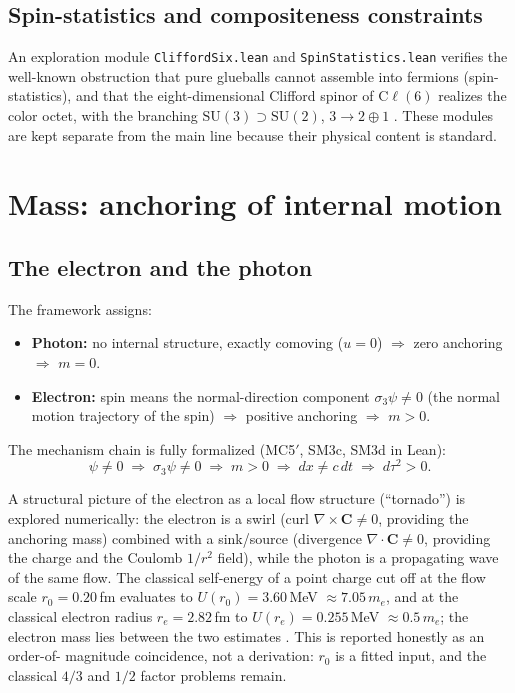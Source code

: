 \documentclass[aps,prd,preprint,superscriptaddress,amsmath,amssymb]{revtex4-2}
\begin{document}
\subsection{Spin-statistics and compositeness constraints}

An exploration module \texttt{CliffordSix.lean} and
\texttt{SpinStatistics.lean} verifies the well-known obstruction that pure
glueballs cannot assemble into fermions (spin-statistics), and that the
eight-dimensional Clifford spinor of $\mathrm{C}\ell(6)$ realizes the color
octet, with the branching $\mathrm{SU}(3)\supset\mathrm{SU}(2)$,
$3\to 2\oplus 1$ \cite{ProjectionPhysics}.  These modules are kept separate
from the main line because their physical content is standard.

\section{Mass: anchoring of internal motion}\label{sec:mass}

\subsection{The electron and the photon}

The framework assigns:
\begin{itemize}
  \item \textbf{Photon:} no internal structure, exactly comoving
  ($u=0$) $\Longrightarrow$ zero anchoring $\Longrightarrow$ $m=0$.
  \item \textbf{Electron:} spin means the normal-direction component
  $\sigma_3\psi\neq 0$ (the normal motion trajectory of the spin)
  $\Longrightarrow$ positive anchoring $\Longrightarrow$ $m>0$.
\end{itemize}
The mechanism chain is fully formalized (MC5$'$, SM3c, SM3d in Lean):
\begin{equation}
\psi\neq 0 \;\Longrightarrow\; \sigma_3\psi\neq 0
\;\Longrightarrow\; m>0
\;\Longrightarrow\; dx \neq c\,dt
\;\Longrightarrow\; d\tau^2 > 0 .
\end{equation}

A structural picture of the electron as a local flow structure (``tornado'')
is explored numerically: the electron is a swirl (curl $\nabla\times\bm{C}
\neq 0$, providing the anchoring mass) combined with a sink/source
(divergence $\nabla\cdot\bm{C}\neq 0$, providing the charge and the Coulomb
$1/r^2$ field), while the photon is a propagating wave of the same flow.
The classical self-energy of a point charge cut off at the flow scale
$r_0=0.20$\,fm evaluates to $U(r_0)=3.60$\,MeV $\approx 7.05\,m_e$, and at
the classical electron radius $r_e=2.82$\,fm to $U(r_e)=0.255$\,MeV
$\approx 0.5\,m_e$; the electron mass lies between the two estimates
\cite{ProjectionPhysics-electron}.  This is reported honestly as an order-of-
magnitude coincidence, not a derivation: $r_0$ is a fitted input, and the
classical $4/3$ and $1/2$ factor problems remain.
\end{document}
